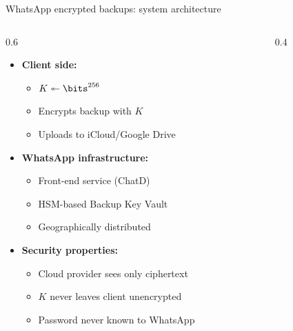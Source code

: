 \ifdefined\PRESENTATION\else\PassOptionsToClass{handout}{beamer}\fi\documentclass[aspectratio=169, lualatex]{beamer}
\begin{document}
\begin{frame}{WhatsApp encrypted backups: system architecture}
	\begin{columns}[c]
		\begin{column}{0.6\textwidth}
			\begin{itemize}
				\item \textbf{Client side:}
				      \begin{itemize}
					      \item $K \twoheadleftarrow \bits^{256}$
					      \item Encrypts backup with $K$
					      \item Uploads to iCloud/Google Drive
				      \end{itemize}
				\item \textbf{WhatsApp infrastructure:}
				      \begin{itemize}
					      \item Front-end service (ChatD)
					      \item HSM-based Backup Key Vault
					      \item Geographically distributed
				      \end{itemize}
				\item \textbf{Security properties:}
				      \begin{itemize}
					      \item Cloud provider sees only ciphertext
					      \item $K$ never leaves client unencrypted
					      \item Password never known to WhatsApp
				      \end{itemize}
			\end{itemize}
		\end{column}
		\begin{column}{0.4\textwidth}
		\end{column}
	\end{columns}
\end{frame}
\end{document}
